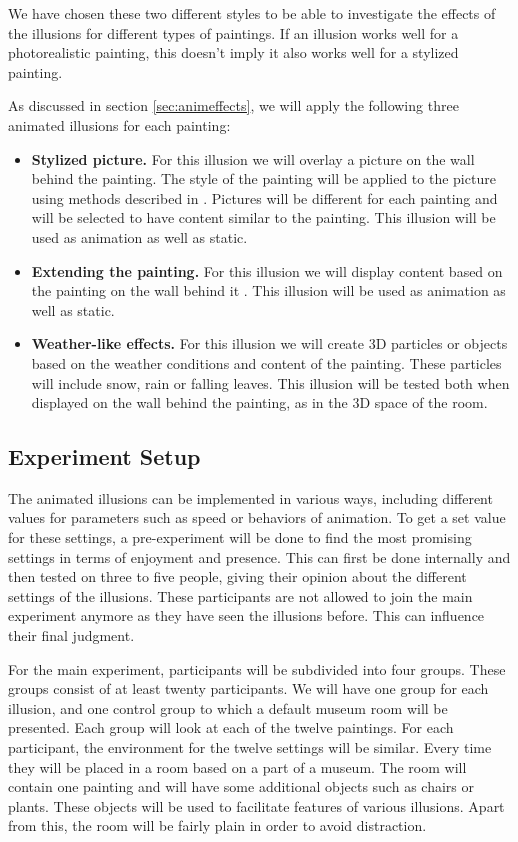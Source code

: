 \documentclass[a4paper]{article}
\begin{document}
We have chosen these two different styles to be able to investigate the effects of the illusions for different types of paintings. If an illusion works well for a photorealistic painting, this doesn't imply it also works well for a stylized painting.

As discussed in section \ref{sec:animeffects}, we will apply the following three animated illusions for each painting:

\begin{itemize}
\item \textbf{Stylized picture.} For this illusion we will overlay a picture on the wall behind the painting. The style of the painting will be applied to the picture using methods described in \cite{gatys}. Pictures will be different for each painting and will be selected to have content similar to the painting. This illusion will be used as animation as well as static.
\item \textbf{Extending the painting.} For this illusion we will display content based on the painting on the wall behind it \cite{inpainting}. This illusion will be used as animation as well as static.
\item \textbf{Weather-like effects.} For this illusion we will create 3D particles or objects based on the weather conditions and content of the painting. These particles will include snow, rain or falling leaves. This illusion will be tested both when displayed on the wall behind the painting, as in the 3D space of the room.
\end{itemize}


\subsection{Experiment Setup}

The animated illusions can be implemented in various ways, including different values for parameters such as speed or behaviors of animation. To get a set value for these settings, a pre-experiment will be done to find the most promising settings in terms of enjoyment and presence. This can first be done internally and then tested on three to five people, giving their opinion about the different settings of the illusions. These participants are not allowed to join the main experiment anymore as they have seen the illusions before. This can influence their final judgment.

For the main experiment, participants will be subdivided into four groups. These groups consist of at least twenty participants. We will have one group for each illusion, and one control group to which a default museum room will be presented. Each group will look at each of the twelve paintings. 
For each participant, the environment for the twelve settings will be similar. Every time they will be placed in a room based on a part of a museum. The room will contain one painting and will have some additional objects such as chairs or plants. These objects will be used to facilitate features of various illusions. Apart from this, the room will be fairly plain in order to avoid distraction.
\end{document}
